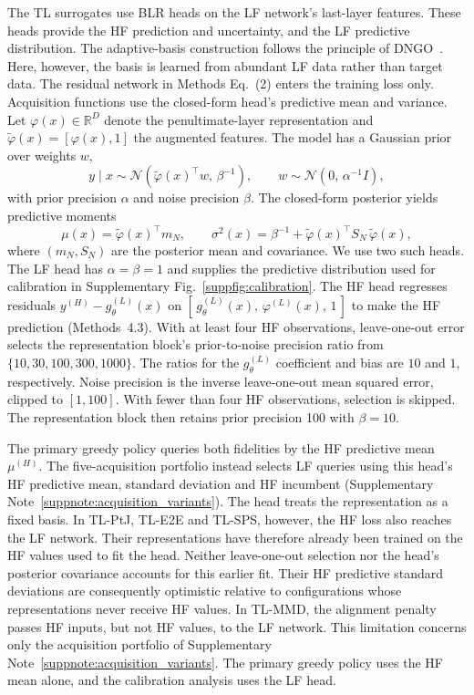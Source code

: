 The TL surrogates use BLR heads on the LF network's last-layer features. These heads provide the HF prediction and uncertainty, and the LF predictive distribution. The adaptive-basis construction follows the principle of DNGO~\citep{snoek2015scalable}. Here, however, the basis is learned from abundant LF data rather than target data. The residual network in Methods Eq.~(2) enters the training loss only. Acquisition functions use the closed-form head's predictive mean and variance. Let $\varphi(x) \in \mathbb{R}^D$ denote the penultimate-layer representation and $\tilde{\varphi}(x) = [\varphi(x), 1]$ the augmented features. The model has a Gaussian prior over weights $w$,
\begin{equation}
y \mid x \sim \mathcal{N}\!\left(\tilde{\varphi}(x)^\top w,\, \beta^{-1}\right), \qquad w \sim \mathcal{N}\!\left(0,\, \alpha^{-1} I\right),
\end{equation}
with prior precision $\alpha$ and noise precision $\beta$. The closed-form posterior
yields predictive moments
\begin{equation}
\mu(x) = \tilde{\varphi}(x)^\top m_N, \qquad \sigma^2(x) = \beta^{-1} + \tilde{\varphi}(x)^\top S_N\, \tilde{\varphi}(x),
\end{equation}
where $(m_N, S_N)$ are the posterior mean and covariance. We use two such heads. The LF head has $\alpha = \beta = 1$ and supplies the predictive distribution used for calibration in Supplementary Fig.~\ref{suppfig:calibration}. The HF head regresses residuals $y^{(H)} - g^{(L)}_{\theta}(x)$ on $[\,g^{(L)}_{\theta}(x),\, \varphi^{(L)}(x),\, 1\,]$ to make the HF prediction (Methods~4.3). With at least four HF observations, leave-one-out error selects the representation block's prior-to-noise precision ratio from $\{10, 30, 100, 300, 1000\}$. The ratios for the $g^{(L)}_{\theta}$ coefficient and bias are $10$ and $1$, respectively. Noise precision is the inverse leave-one-out mean squared error, clipped to $[1, 100]$. With fewer than four HF observations, selection is skipped. The representation block then retains prior precision 100 with $\beta = 10$.

The primary greedy policy queries both fidelities by the HF predictive mean $\mu^{(H)}$. The five-acquisition portfolio instead selects LF queries using this head's HF predictive mean, standard deviation and HF incumbent (Supplementary Note~\ref{suppnote:acquisition_variants}). The head treats the representation as a fixed basis. In TL-PtJ, TL-E2E and TL-SPS, however, the HF loss also reaches the LF network. Their representations have therefore already been trained on the HF values used to fit the head. Neither leave-one-out selection nor the head's posterior covariance accounts for this earlier fit. Their HF predictive standard deviations are consequently optimistic relative to configurations whose representations never receive HF values. In TL-MMD, the alignment penalty passes HF inputs, but not HF values, to the LF network. This limitation concerns only the acquisition portfolio of Supplementary Note~\ref{suppnote:acquisition_variants}. The primary greedy policy uses the HF mean alone, and the calibration analysis uses the LF head.



